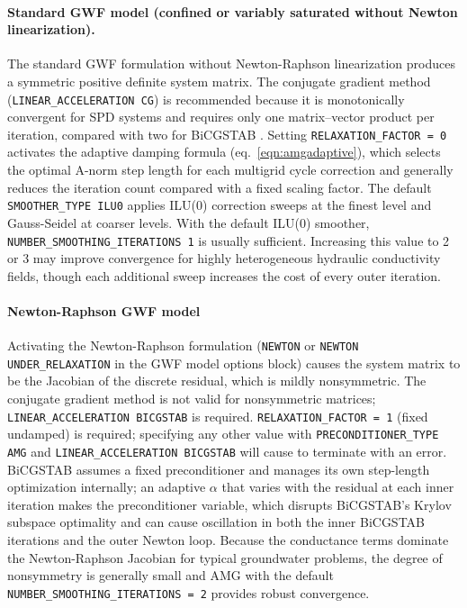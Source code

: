 \paragraph{Standard GWF model (confined or variably saturated without Newton linearization).}
The standard GWF formulation without Newton-Raphson linearization produces a symmetric positive definite system matrix. The conjugate gradient method \citep{saad2003iterative} (\texttt{LINEAR\_ACCELERATION CG}) is recommended because it is monotonically convergent for SPD systems and requires only one matrix--vector product per iteration, compared with two for BiCGSTAB \citep{vandervorst1992}. Setting \texttt{RELAXATION\_FACTOR = 0} activates the adaptive damping formula (eq.~\ref{eqn:amgadaptive}), which selects the optimal A-norm step length for each multigrid cycle correction and generally reduces the iteration count compared with a fixed scaling factor. The default \texttt{SMOOTHER\_TYPE ILU0} applies ILU(0) correction sweeps at the finest level and Gauss-Seidel at coarser levels. With the default ILU(0) smoother, \texttt{NUMBER\_SMOOTHING\_ITERATIONS 1} is usually sufficient. Increasing this value to 2 or 3 may improve convergence for highly heterogeneous hydraulic conductivity fields, though each additional sweep increases the cost of every outer iteration.

\paragraph{Newton-Raphson GWF model}
Activating the Newton-Raphson formulation (\texttt{NEWTON} or \texttt{NEWTON UNDER\_RELAXATION} in the GWF model options block) causes the system matrix to be the Jacobian of the discrete residual, which is mildly nonsymmetric. The conjugate gradient method is not valid for nonsymmetric matrices; \texttt{LINEAR\_ACCELERATION BICGSTAB} is required. \texttt{RELAXATION\_FACTOR = 1} (fixed undamped) is required; specifying any other value with \texttt{PRECONDITIONER\_TYPE AMG} and \texttt{LINEAR\_ACCELERATION BICGSTAB} will cause \mf to terminate with an error. BiCGSTAB assumes a fixed preconditioner and manages its own step-length optimization internally; an adaptive $\alpha$ that varies with the residual at each inner iteration makes the preconditioner variable, which disrupts BiCGSTAB's Krylov subspace optimality and can cause oscillation in both the inner BiCGSTAB iterations and the outer Newton loop. Because the conductance terms dominate the Newton-Raphson Jacobian for typical groundwater problems, the degree of nonsymmetry is generally small and AMG with the default \texttt{NUMBER\_SMOOTHING\_ITERATIONS = 2} provides robust convergence.

